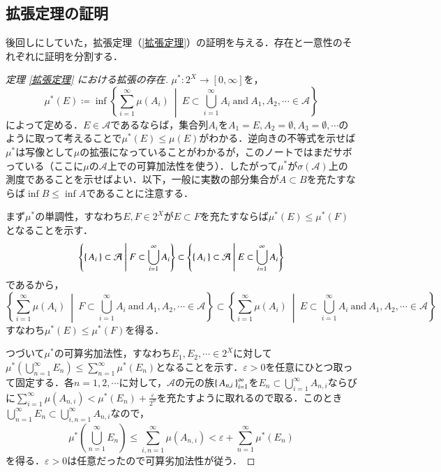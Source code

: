 \subsection{拡張定理の証明}

後回しにしていた，拡張定理（\cref{拡張定理}）の証明を与える．存在と一意性のそれぞれに証明を分割する．

\caratheodory*

\begin{proof}[定理 \ref{拡張定理} における拡張の存在]$\mu^* \colon 2^X \to [0,\infty]$を，
\begin{equation}
\mu^*(E) \coloneqq \inf \left\{ \sum_{i=1}^\infty \mu(A_i) \ \middle| \ E \subset \bigcup_{i=1}^\infty A_i \ \text{and} \ A_1,A_2, \cdots \in \mathcal{A} \right\}
\end{equation}によって定める．$E \in \mathcal{A}$であるならば，集合列$A_i$を$A_1 = E, A_2 = \emptyset, A_3 = \emptyset, \cdots$のように取って考えることで$\mu^*(E) \leq \mu(E)$がわかる．逆向きの不等式を示せば$\mu^*$は写像として$\mu$の拡張になっていることがわかるが，このノートではまだサボっている（ここに$\mu$の$\mathcal{A}$上での可算加法性を使う）．したがって$\mu^*$が$\sigma(\mathcal{A})$上の測度であることを示せばよい．以下，一般に実数の部分集合が$A \subset B$を充たすならば$\inf B \leq \inf A$であることに注意する．

まず$\mu^*$の単調性，すなわち$E, F \in 2^X$が$E \subset F$を充たすならば$\mu^*(E) \leq \mu^*(F)$となることを示す．
\begin{equation}
\left\{ \set{A_i} \subset \mathcal{A}  \ \middle| \ F \subset \bigcup_{i=1}^\infty A_i \right\}
\subset
\left\{ \set{A_i}  \subset \mathcal{A} \ \middle| \ E \subset \bigcup_{i=1}^\infty A_i \right\}
\end{equation}であるから，
\begin{equation}
\left\{ \sum_{i=1}^\infty \mu(A_i) \ \middle| \ F \subset \bigcup_{i=1}^\infty A_i \ \text{and} \ A_1,A_2, \cdots \in \mathcal{A} \right\}
\subset
\left\{ \sum_{i=1}^\infty \mu(A_i) \ \middle| \ E \subset \bigcup_{i=1}^\infty A_i \ \text{and} \ A_1,A_2, \cdots \in \mathcal{A} \right\}
\end{equation}すなわち$\mu^*(E) \leq \mu^*(F)$を得る．

つづいて$\mu^*$の可算劣加法性，すなわち$E_1, E_2, \cdots \in 2^X$に対して$\mu^* \left( \bigcup_{n=1}^\infty E_n \right) \leq \sum_{n=1}^\infty \mu^*(E_n)$となることを示す．$\varepsilon > 0$を任意にひとつ取って固定する．各$n =1,2,\cdots$に対して，$\mathcal{A}$の元の族$\set{A_{n,i}}_{i=1}^\infty$を$E_n \subset \bigcup_{i=1}^\infty A_{n,i}$ならびに$\sum_{i=1}^\infty \mu(A_{n,i}) < \mu^*(E_n) + \frac{\varepsilon}{2^n}$を充たすように取れるので取る．このとき$\bigcup_{n=1}^\infty E_n \subset \bigcup_{i,n=1}^\infty A_{n,i}$なので，
\begin{equation}
\mu^*\left(\bigcup_{n=1}^\infty E_n \right) \leq \sum_{i,n=1}^\infty \mu(A_{n,i}) <  \varepsilon + \sum_{n=1}^\infty \mu^*(E_n) 
\end{equation}を得る．$\varepsilon > 0$は任意だったので可算劣加法性が従う．


\end{proof}
